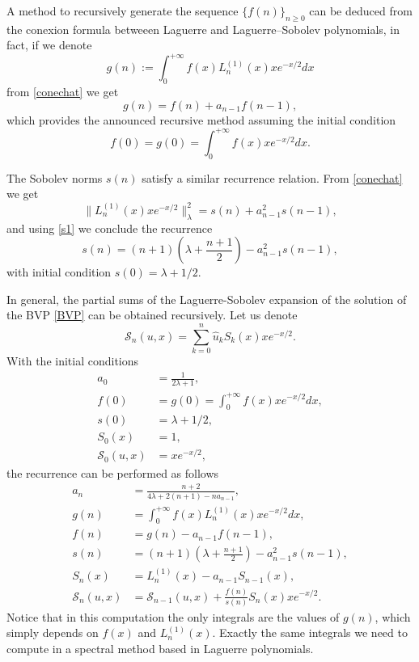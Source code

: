 \documentclass[reqno,10pt]{amsart}
\theoremstyle{plain}
\numberwithin{equation}{section}
\numberwithin{figure}{section}
\begin{document}
A  method to recursively generate the sequence $\{{f}(n)\}_{n\geqslant0}$ can be deduced from the conexion formula betweeen Laguerre and Laguerre--Sobolev polynomials, in fact, if we denote
\[
g(n):= \int_{0}^{+\infty} f(x) L^{(1)}_{n}(x) x e^{-x/2}dx
\]
from \eqref{conechat} we get
\[
g(n) = f(n) + {a}_{n-1}  f(n-1),
\]
which provides the announced recursive method assuming the initial condition \[f(0) = g(0) = \int_{0}^{+\infty} f(x) x e^{-x/2}dx.\]

The Sobolev norms \(s(n)\) satisfy a similar recurrence relation. From \eqref{conechat} we get
\[
\| L^{(1)}_{n}(x) x e^{-x/2}\|^2_\lambda = s(n) + {a}_{n-1}^2  s(n-1),
\]
and using \eqref{s1} we conclude  the recurrence
\[
s(n) = (n+1)\left(\lambda+\frac{n+1}{2}\right) - {a}_{n-1}^2  s(n-1),
\]
with initial condition \(s(0) = \lambda + 1/2.\)

\medskip

In general, the partial sums of the Laguerre-Sobolev expansion of the solution of the BVP \eqref{BVP} can be obtained recursively.
Let us denote
\[
\mathcal{S}_n(u,x) = \sum_{k=0}^n \widehat{u}_k S_{k}(x) x e^{-x/2}.
\]
With the initial conditions
\begin{align}
a_0 &= \frac{1}{2 \lambda + 1}, \nonumber\\
f(0) &= g(0) = \int_{0}^{+\infty} f(x) x e^{-x/2}dx,\nonumber\\
s(0) &= \lambda + 1/2,\label{initial_cond}\\
S_0(x)&= 1, \nonumber\\
\mathcal{S}_0(u,x) &= x e^{-x/2}, \nonumber 
\end{align}
the recurrence can be performed as follows
\begin{align}
a_n &= \frac{n+2}{4 \lambda + 2(n+1) - n a_{n-1}}, \nonumber\\
g(n) &= \int_{0}^{+\infty} f(x) L^{(1)}_{n}(x) x e^{-x/2}dx, \nonumber\\
f(n) &= g(n) - {a}_{n-1}  f(n-1), \nonumber\\
s(n) &= (n+1)\left(\lambda+\frac{n+1}{2}\right) - {a}_{n-1}^2  s(n-1),\label{recurrence}\\
S_n(x)&= L^{(1)}_{n}(x) - {a}_{n-1} S_{n-1}(x), \nonumber\\
\mathcal{S}_n(u,x) &= \mathcal{S}_{n-1}(u,x) + \frac{f(n)}{s(n)} S_n(x) x e^{-x/2}. \nonumber
\end{align}
Notice that in this computation the only integrals are the values of $g(n)$, which simply depends on $f(x)$ and $L^{(1)}_{n}(x)$. Exactly the same integrals we need to compute in a spectral method based in Laguerre polynomials.
\end{document}
